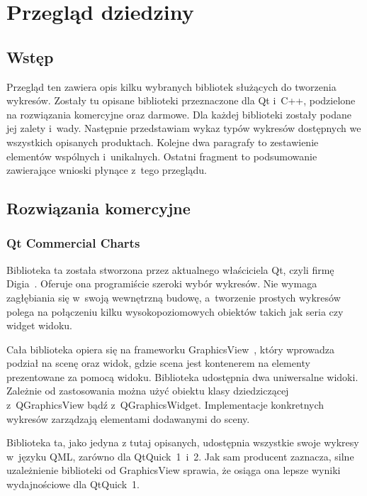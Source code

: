 

\chapter{Przegląd dziedziny}
\section{Wstęp}
Przegląd ten zawiera opis kilku wybranych bibliotek służących do tworzenia wykresów. Zostały tu opisane biblioteki przeznaczone dla Qt i~C++, podzielone na rozwiązania komercyjne oraz darmowe. Dla każdej biblioteki zostały podane jej zalety i~wady. Następnie przedstawiam wykaz typów wykresów dostępnych we wszystkich opisanych produktach. Kolejne dwa paragrafy to zestawienie elementów wspólnych i~unikalnych. Ostatni fragment to podsumowanie zawierające wnioski płynące z~tego przeglądu.

\section{Rozwiązania komercyjne}
\subsection{Qt Commercial Charts}
Biblioteka ta została stworzona przez aktualnego właściciela Qt, czyli firmę Digia~\cite{digia}. Oferuje ona programiście szeroki wybór wykresów. Nie wymaga zagłębiania się w~swoją wewnętrzną budowę, a~tworzenie prostych wykresów polega na połączeniu kilku wysokopoziomowych obiektów takich jak seria czy widget widoku.\newline

Cała biblioteka opiera się na frameworku GraphicsView~\cite{graphicsview}, który wprowadza podział na scenę oraz widok, gdzie scena jest kontenerem na elementy prezentowane za pomocą widoku.
Biblioteka udostępnia dwa uniwersalne widoki. Zależnie od zastosowania można użyć obiektu klasy dziedziczącej z~QGraphicsView bądź z~QGraphicsWidget. Implementacje konkretnych wykresów zarządzają elementami dodawanymi do sceny.\newline

Biblioteka ta, jako jedyna z tutaj opisanych, udostępnia wszystkie swoje wykresy w~języku QML, zarówno dla QtQuick~1~i~2.
Jak sam producent zaznacza, silne uzależnienie biblioteki od GraphicsView sprawia, że osiąga ona lepsze wyniki wydajnościowe dla QtQuick~1.\newline

